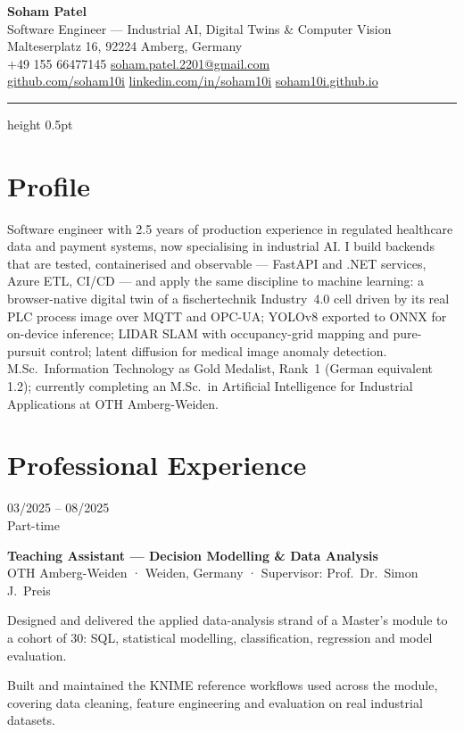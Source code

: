 \documentclass[10pt,a4paper]{article}
\newlength{\cvleft}\setlength{\cvleft}{30mm}
\newlength{\cvgap}\setlength{\cvgap}{5mm}
\newcommand{\cvrow}[2]{%
  \noindent\begin{minipage}[t]{\cvleft}\raggedright\strut #1\end{minipage}%
  \hspace{\cvgap}%
  \begin{minipage}[t]{\dimexpr\textwidth-\cvleft-\cvgap\relax}\strut #2\end{minipage}%
  \par\vspace{4.5pt}}
\newcommand{\dates}[1]{\sansfont\fontsize{9}{11}\selectfont\color{mid}#1}
\newcommand{\role}[1]{\textbf{#1}}
\newcommand{\org}[1]{{\color{mid}\fontsize{9.5}{12}\selectfont #1}}
\begin{document}
{\sansfont\fontsize{21}{24}\selectfont\bfseries Soham Patel}\\[3pt]
{\sansfont\fontsize{10.5}{13}\selectfont\color{accent}Software Engineer — Industrial AI, Digital Twins \& Computer Vision}\\[6pt]
{\fontsize{9.5}{13.5}\selectfont\color{mid}
Malteserplatz 16, 92224 Amberg, Germany \\
+49 155 66477145 \quad\textbullet\quad \href{mailto:soham.patel.2201@gmail.com}{soham.patel.2201@gmail.com} \\
\href{https://github.com/soham10i}{github.com/soham10i} \quad\textbullet\quad
\href{https://linkedin.com/in/soham10i}{linkedin.com/in/soham10i} \quad\textbullet\quad
\href{https://soham10i.github.io}{soham10i.github.io}
}\\[3pt]
{\color{hairline}\hrule height 0.5pt}
\vspace{2pt}

\section{Profile}
Software engineer with 2.5 years of production experience in regulated healthcare data and payment
systems, now specialising in industrial AI. I build backends that are tested, containerised and
observable — FastAPI and .NET services, Azure ETL, CI/CD — and apply the same discipline to machine
learning: a browser-native digital twin of a fischertechnik Industry~4.0 cell driven by its real PLC
process image over MQTT and OPC-UA; YOLOv8 exported to ONNX for on-device inference; LIDAR SLAM with
occupancy-grid mapping and pure-pursuit control; latent diffusion for medical image anomaly detection.
M.Sc.\ Information Technology as Gold Medalist, Rank~1 (German equivalent 1.2); currently completing
an M.Sc.\ in Artificial Intelligence for Industrial Applications at OTH Amberg-Weiden.

\section{Professional Experience}

\cvrow{\dates{03/2025 – 08/2025 \\ Part-time}}{%
\role{Teaching Assistant — Decision Modelling \& Data Analysis}\\
\org{OTH Amberg-Weiden · Weiden, Germany · Supervisor: Prof.\ Dr.\ Simon J.\ Preis}
\begin{pts}
\item Designed and delivered the applied data-analysis strand of a Master's module to a cohort of 30: SQL, statistical modelling, classification, regression and model evaluation.
\item Built and maintained the KNIME reference workflows used across the module, covering data cleaning, feature engineering and evaluation on real industrial datasets.
\end{pts}}
\end{document}
